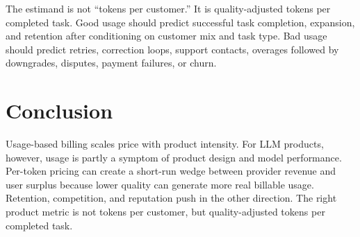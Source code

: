 \documentclass[10pt,twocolumn]{article}
\begin{document}
The estimand is not ``tokens per customer.'' It is quality-adjusted tokens per completed task. Good usage should predict successful task completion, expansion, and retention after conditioning on customer mix and task type. Bad usage should predict retries, correction loops, support contacts, overages followed by downgrades, disputes, payment failures, or churn.

\section*{Conclusion}
Usage-based billing scales price with product intensity. For LLM products, however, usage is partly a symptom of product design and model performance. Per-token pricing can create a short-run wedge between provider revenue and user surplus because lower quality can generate more real billable usage. Retention, competition, and reputation push in the other direction. The right product metric is not tokens per customer, but quality-adjusted tokens per completed task.
\end{document}
